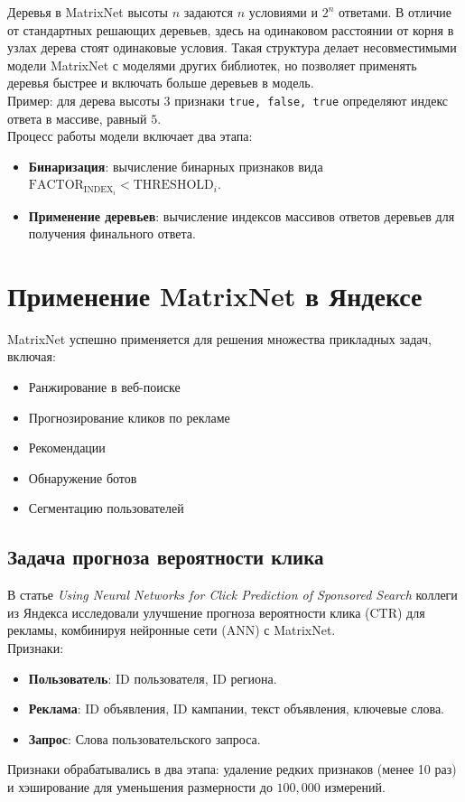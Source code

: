 Деревья в MatrixNet высоты $n$ задаются $n$ условиями и $2^n$ ответами. В отличие от стандартных решающих деревьев, здесь на одинаковом расстоянии от корня в узлах дерева стоят одинаковые условия. Такая структура делает несовместимыми модели MatrixNet с моделями других библиотек, но позволяет применять деревья быстрее и включать больше деревьев в модель.\\
Пример: для дерева высоты 3 признаки \texttt{true, false, true} определяют индекс ответа в массиве, равный $5$.\\
Процесс работы модели включает два этапа:
\begin{itemize}
    \item \textbf{Бинаризация}: вычисление бинарных признаков вида $\text{FACTOR}_{\text{INDEX}_i} < \text{THRESHOLD}_i$.
    \item \textbf{Применение деревьев}: вычисление индексов массивов ответов деревьев для получения финального ответа.
\end{itemize}

\section{Применение MatrixNet в Яндексе}
MatrixNet успешно применяется для решения множества прикладных задач, включая:
\begin{itemize}
    \item Ранжирование в веб-поиске
    \item Прогнозирование кликов по рекламе
    \item Рекомендации
    \item Обнаружение ботов
    \item Сегментацию пользователей
\end{itemize}

\subsection{Задача прогноза вероятности клика}
В статье \emph{Using Neural Networks for Click Prediction of Sponsored Search} коллеги из Яндекса исследовали улучшение прогноза вероятности клика (CTR) для рекламы, комбинируя нейронные сети (ANN) с MatrixNet.\\

Признаки:
\begin{itemize}
    \item \textbf{Пользователь}: ID пользователя, ID региона.
    \item \textbf{Реклама}: ID объявления, ID кампании, текст объявления, ключевые слова.
    \item \textbf{Запрос}: Слова пользовательского запроса.
\end{itemize}
Признаки обрабатывались в два этапа: удаление редких признаков (менее 10 раз) и хэширование для уменьшения размерности до $100{,}000$ измерений.

